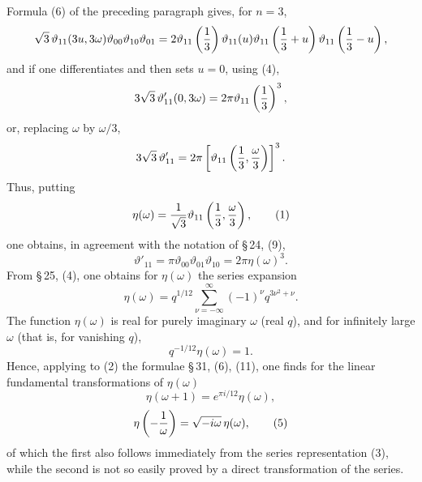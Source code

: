 \documentclass[11pt]{article}
\providecommand{\tht}{\vartheta}
\begin{document}
Formula (6) of the preceding paragraph gives, for $n=3$,
\[
\sqrt3\,\tht_{11}(3u,3\omega)\tht_{00}\tht_{10}\tht_{01}
=2\tht_{11}\left({1\over3}\right)\tht_{11}(u)\tht_{11}\left({1\over3}+u\right)\tht_{11}\left({1\over3}-u\right),
\]
and if one differentiates and then sets $u=0$, using (4),
\[
3\sqrt3\,\tht'_{11}(0,3\omega)=2\pi\tht_{11}\left({1\over3}\right)^3,
\]
or, replacing $\omega$ by $\omega/3$,
\[
3\sqrt3\,\tht'_{11}=2\pi\left[\tht_{11}\left({1\over3},{\omega\over3}\right)\right]^3.
\]
Thus, putting
\begin{equation}
\eta(\omega)={1\over\sqrt3}\tht_{11}\left({1\over3},{\omega\over3}\right), \tag{1}
\end{equation}
one obtains, in agreement with the notation of \S\,24, (9),
\begin{equation}
\tht'_{11}=\pi\tht_{00}\tht_{01}\tht_{10}=2\pi\eta(\omega)^3. \tag{2}
\end{equation}
From \S\,25, (4), one obtains for $\eta(\omega)$ the series expansion
\begin{equation}
\eta(\omega)=q^{1/12}\sum_{\nu=-\infty}^{\infty}(-1)^\nu q^{3\nu^2+\nu}. \tag{3}
\end{equation}
The function $\eta(\omega)$ is real for purely imaginary $\omega$ (real $q$), and for infinitely large $\omega$ (that is, for vanishing $q$),
\[
q^{-1/12}\eta(\omega)=1.
\]
Hence, applying to (2) the formulae \S\,31, (6), (11), one finds for the linear fundamental transformations of $\eta(\omega)$
\begin{equation}
\eta(\omega+1)=e^{\pi i/12}\eta(\omega), \tag{4}
\end{equation}
\begin{equation}
\eta\left(-{1\over\omega}\right)=\sqrt{-i\omega}\,\eta(\omega), \tag{5}
\end{equation}
of which the first also follows immediately from the series representation (3), while the second is not so easily proved by a direct transformation of the series.
\end{document}

